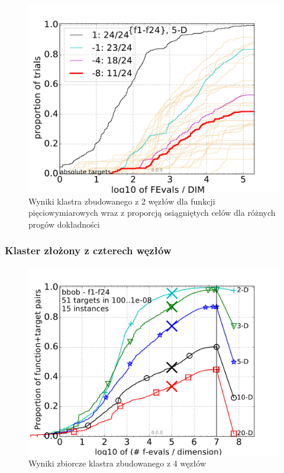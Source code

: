\documentclass[12pt, twoside, openany, abstract=on]{report}
\theoremstyle{definition}
\begin{document}
\begin{figure}[H]
    \includegraphics[scale=.75]{charts/2nodes_5D.pdf} 
 \caption{Wyniki klastra zbudowanego z 2 węzłów dla funkcji pięciowymiarowych wraz z proporcją osiągniętych celów dla różnych progów dokładności}
\end{figure}


\subsubsection{Klaster złożony z czterech węzłów}

\begin{figure}[H]
    \includegraphics[scale=.75]{charts/4nodes.pdf} 
 \caption{Wyniki zbiorcze klastra zbudowanego z 4 węzłów}
\end{figure}
\end{document}
